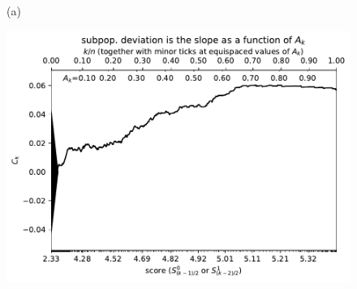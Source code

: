 \documentclass{article}
\newlength{\vertsep}
\newlength{\imsize}
\begin{document}
\begin{figure}
\begin{centering}

(a)
\parbox{\imsize}{\includegraphics[width=\imsize]
{../codes/weighted/County_of_San_Francisco_vs_San_Joaquin-LNGI/cumulative.pdf}}

\vspace{\vertsep}


\end{centering}
\end{figure}
\end{document}
